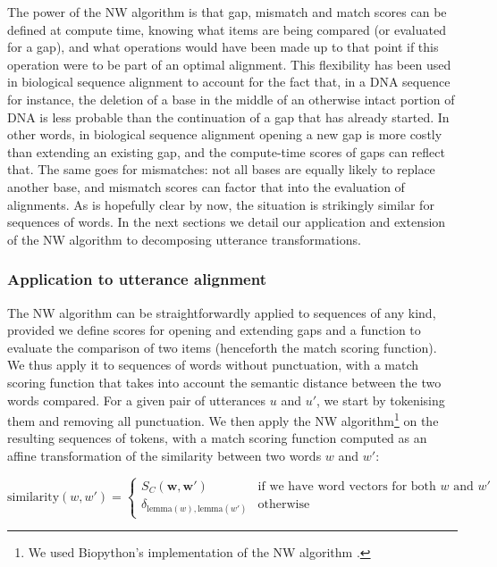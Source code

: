 The power of the NW algorithm is that gap, mismatch and match scores can
be defined at compute time, knowing what items are being compared (or
evaluated for a gap), and what operations would have been made up to
that point if this operation were to be part of an optimal alignment.
This flexibility has been used in biological sequence alignment to
account for the fact that, in a DNA sequence for instance, the deletion
of a base in the middle of an otherwise intact portion of DNA is less
probable than the continuation of a gap that has already started. In
other words, in biological sequence alignment opening a new gap is more
costly than extending an existing gap, and the compute-time scores of
gaps can reflect that. The same goes for mismatches: not all bases are
equally likely to replace another base, and mismatch scores can factor
that into the evaluation of alignments. As is hopefully clear by now,
the situation is strikingly similar for sequences of words. In the next
sections we detail our application and extension of the NW algorithm to
decomposing utterance transformations.

\subsubsection{Application to utterance
alignment}\label{application-to-utterance-alignment}

The NW algorithm can be straightforwardly applied to sequences of any
kind, provided we define scores for opening and extending gaps and a
function to evaluate the comparison of two items (henceforth the match
scoring function). We thus apply it to sequences of words without
punctuation, with a match scoring function that takes into account the
semantic distance between the two words compared. For a given pair of
utterances \(u\) and \(u'\), we start by tokenising them and removing
all punctuation. We then apply the NW algorithm\footnote{We used
  Biopython's implementation of the NW algorithm
  \autocite{cock_biopython:_2009}.} on the resulting sequences of
tokens, with a match scoring function computed as an affine
transformation of the similarity between two words \(w\) and \(w'\):

\[
\text{similarity}(w, w') = \begin{cases}
  S_C \left( \bm{w}, \bm{w}' \right) & \text{if we have word vectors for both $w$ and $w'$} \\
  \delta_{\text{lemma}(w), \text{lemma}(w')} & \text{otherwise}
\end{cases}
\]

